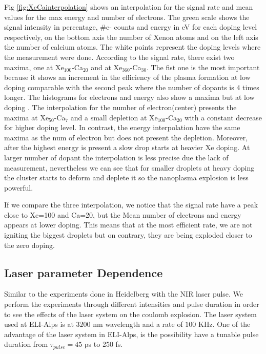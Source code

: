 Fig \ref{fig:XeCainterpolation} shows an interpolation for the signal rate and mean values for the max energy and number of electrons. The green scale shows the signal intensity in percentage, $\#$e- counts and  energy in eV for each doping level respectively, on the bottom axis  the number of Xenon atoms and on the left axis the number of calcium atoms. The white points represent the doping levels where the measurement were done. According to the signal rate, there exist two maxima, one at Xe$_{100}$-Ca$_{20}$ and at Xe$_{360}$-Ca$_{30}$. The fist one is the most important because it shows an increment in the efficiency of the plasma formation at low doping comparable with the second peak where the number of dopants is 4 times longer. The histograms for electrons and energy also show a maxima but at low doping . The interpolation for the number of electron(center) presents the maxima at Xe$_{50}$-Ca$_{7}$ and a small depletion at  Xe$_{100}$-Ca$_{20}$ with a constant decrease for higher doping level. In contrast, the energy interpolation have the same maxima as the num of electron but does not present the depletion. Moreover, after the highest energy is present  a slow drop starts at  heavier Xe doping. At larger number of dopant the interpolation is less precise due the lack of measurement, nevertheless we can see that  for smaller droplets at heavy doping the cluster starts to deform and deplete it so the nanoplasma explosion is  less powerful.

If we compare the three interpolation, we notice that the signal rate have a peak close to Xe=100 and Ca=20, but the Mean number of electrons and energy appears at lower doping. This means that at the most efficient rate, we are not igniting the biggest droplets but on contrary, they are being exploded closer to the zero doping.



\subsection{Laser parameter Dependence}

Similar to the experiments done in Heidelberg with the NIR laser pulse. We perform the experiments through different intensities and pulse duration in order to see the effects of the laser system on the coulomb explosion. The laser system used at ELI-Alps is at $3200$ nm wavelength and a rate of $100$ KHz.  One of the advantage of the laser system in ELI-Alps, is the possibility have a tunable pulse duration from $\tau_{pulse}=45$ ps to 250 fs.

